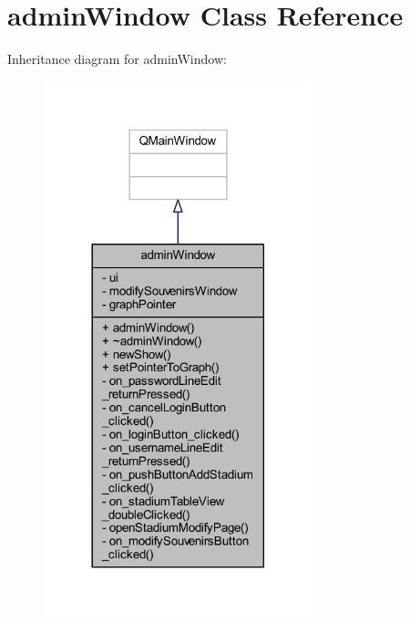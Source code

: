\hypertarget{classadmin_window}{}\section{admin\+Window Class Reference}
\label{classadmin_window}


Inheritance diagram for admin\+Window\+:\nopagebreak
\begin{figure}[H]
\begin{center}
\leavevmode
\includegraphics[width=221pt]{classadmin_window__inherit__graph}
\end{center}
\end{figure}



